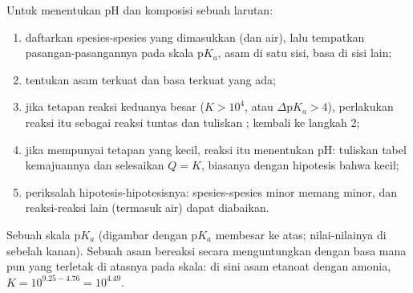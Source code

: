 \begin{method}\label{met:b1:predominant-reaction:method}
Untuk menentukan pH dan komposisi sebuah larutan:
\begin{enumerate}
  \item daftarkan spesies-spesies yang dimasukkan (dan air), lalu
        tempatkan pasangan-pasangannya pada skala $\mathrm{p}K_a$, asam di
        satu sisi, basa di sisi lain;
  \item tentukan asam terkuat dan basa terkuat yang ada;
  \item jika tetapan reaksi keduanya besar ($K > 10^4$, atau
        $\Delta\mathrm{p}K_a > 4$), perlakukan reaksi itu sebagai reaksi
        tuntas dan tuliskan ; kembali ke langkah 2;
  \item jika  mempunyai tetapan yang kecil, reaksi itu
        menentukan pH: tuliskan tabel kemajuannya dan selesaikan $Q = K$,
        biasanya dengan hipotesis bahwa  kecil;
  \item periksalah hipotesis-hipotesisnya: spesies-spesies minor memang
        minor, dan reaksi-reaksi lain (termasuk  air) dapat
        diabaikan.
\end{enumerate}
\end{method}

\begin{omfigure}

{\small Sebuah skala $\mathrm{p}K_a$ (digambar dengan p$K_a$ membesar ke
atas; nilai-nilainya di sebelah kanan). Sebuah asam bereaksi secara
menguntungkan dengan basa mana pun yang terletak di atasnya pada skala:
di sini asam etanoat dengan amonia, $K = 10^{9.25 - 4.76} = 10^{4.49}$.}
\end{omfigure}

